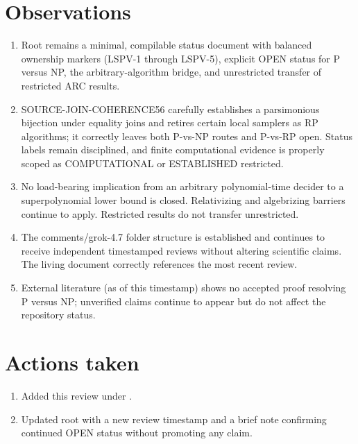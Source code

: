 \documentclass[11pt]{article}
\begin{document}
\section{Observations}
\begin{enumerate}
\item Root  remains a minimal, compilable status document with balanced ownership markers (LSPV-1 through LSPV-5), explicit OPEN status for P versus NP, the arbitrary-algorithm bridge, and unrestricted transfer of restricted ARC results.
\item SOURCE-JOIN-COHERENCE56 carefully establishes a parsimonious bijection under equality joins and retires certain local samplers as RP algorithms; it correctly leaves both P-vs-NP routes and P-vs-RP open. Status labels remain disciplined, and finite computational evidence is properly scoped as COMPUTATIONAL or ESTABLISHED restricted.
\item No load-bearing implication from an arbitrary polynomial-time decider to a superpolynomial lower bound is closed. Relativizing and algebrizing barriers continue to apply. Restricted results do not transfer unrestricted.
\item The comments/grok-4.7 folder structure is established and continues to receive independent timestamped reviews without altering scientific claims. The living document correctly references the most recent review.
\item External literature (as of this timestamp) shows no accepted proof resolving P versus NP; unverified claims continue to appear but do not affect the repository status.
\end{enumerate}

\section{Actions taken}
\begin{enumerate}
\item Added this review under .
\item Updated root  with a new review timestamp and a brief note confirming continued OPEN status without promoting any claim.
\end{enumerate}
\end{document}
